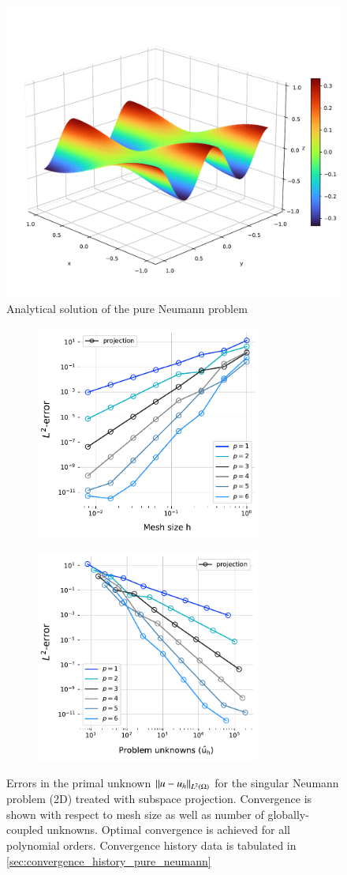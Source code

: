 \begin{figure}[htpb]
  \centering
  \includegraphics[width=0.5\linewidth]{img/dp_study_analytical.pdf}
  \caption{Analytical solution of the pure Neumann problem}
  \label{fig:dp_neumann_problem_analytical}
\end{figure}
\begin{figure}[ht]
    \centering
    \begin{subfigure}{0.45\textwidth}
        \includegraphics[height=7cm]{img/PNP_conv_2D.pdf}
    \end{subfigure}
    \begin{subfigure}{0.45\textwidth}
        \includegraphics[height=7cm]{img/PNP_conv_2D_dofs.pdf}
    \end{subfigure}
    \caption{Errors in the primal unknown $\left\lVert u - u_h \right\rVert_{L^2(\Omega)} $ for the singular Neumann problem (2D) treated with subspace projection. Convergence is shown with respect to mesh size as well as number of globally-coupled unknowns. Optimal convergence is achieved for all polynomial orders.
    Convergence history data is tabulated in \ref{sec:convergence_history_pure_neumann}}
    \label{fig:INS:convergence_singular_system_projection}
\end{figure}


